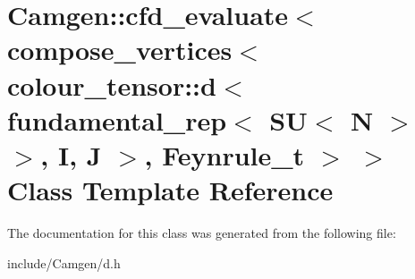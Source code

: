 \hypertarget{a00058}{\section{Camgen\-:\-:cfd\-\_\-evaluate$<$ compose\-\_\-vertices$<$ colour\-\_\-tensor\-:\-:d$<$ fundamental\-\_\-rep$<$ S\-U$<$ N $>$ $>$, I, J $>$, Feynrule\-\_\-t $>$ $>$ Class Template Reference}
\label{a00058}
}


The documentation for this class was generated from the following file\-:\begin{DoxyCompactItemize}
\item 
include/\-Camgen/d.\-h\end{DoxyCompactItemize}
